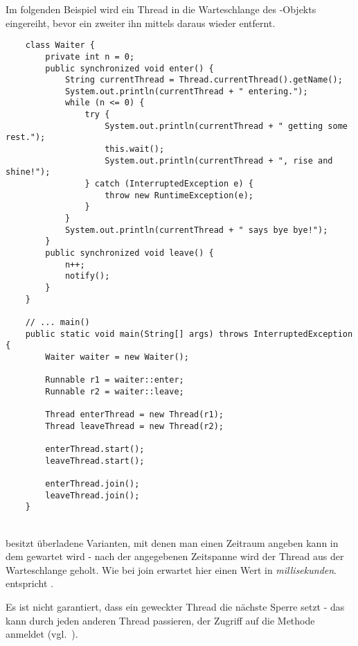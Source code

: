 \newpage
\noindent
Im folgenden Beispiel wird ein Thread in die Warteschlange des -Objekts eingereiht, bevor ein zweiter ihn mittels  daraus wieder entfernt.
\begin{verbatim}
    class Waiter {
        private int n = 0;
        public synchronized void enter() {
            String currentThread = Thread.currentThread().getName();
            System.out.println(currentThread + " entering.");
            while (n <= 0) {
                try {
                    System.out.println(currentThread + " getting some rest.");
                    this.wait();
                    System.out.println(currentThread + ", rise and shine!");
                } catch (InterruptedException e) {
                    throw new RuntimeException(e);
                }
            }
            System.out.println(currentThread + " says bye bye!");
        }
        public synchronized void leave() {
            n++;
            notify();
        }
    }

    // ... main()
    public static void main(String[] args) throws InterruptedException {
        Waiter waiter = new Waiter();

        Runnable r1 = waiter::enter;
        Runnable r2 = waiter::leave;

        Thread enterThread = new Thread(r1);
        Thread leaveThread = new Thread(r2);

        enterThread.start();
        leaveThread.start();

        enterThread.join();
        leaveThread.join();
    }
\end{verbatim}\\

\newpage
\noindent
{} besitzt überladene Varianten, mit denen man einen Zeitraum angeben kann in dem gewartet wird - nach der angegebenen Zeitspanne wird der Thread aus der Warteschlange geholt.
Wie bei join erwartet  hier einen Wert in \textit{millisekunden}.  entspricht .


\begin{tcolorbox}[enlarge top by=0.5cm,enlarge bottom by=0.5cm]
    Es ist nicht garantiert, dass ein geweckter Thread die nächste Sperre setzt - das kann durch jeden anderen Thread passieren, der Zugriff auf die Methode anmeldet (vgl.~\cite[61]{Oec22}).
\end{tcolorbox}\\

